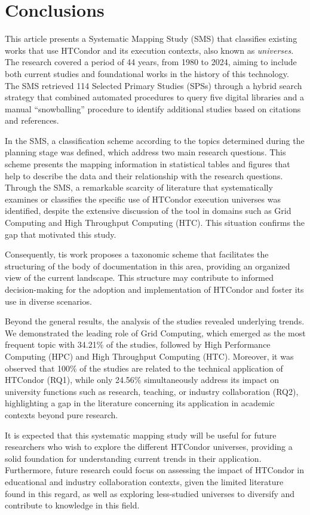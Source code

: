 \section{Conclusions}\label{sec:conclusiones}

This article presents a Systematic Mapping Study (SMS) that classifies existing works that use HTCondor and its execution contexts, also known as \textit{universes}. The research covered a period of 44 years, from 1980 to 2024, aiming to include both current studies and foundational works in the history of this technology. The SMS retrieved 114 Selected Primary Studies (SPSs) through a hybrid search strategy that combined automated procedures to query five digital libraries and a manual “snowballing” procedure to identify additional studies based on citations and references.

In the SMS, a classification scheme according to the topics determined during the planning stage was defined, which address two main research questions. This scheme presents the mapping information in statistical tables and figures that help to describe the data and their relationship with the research questions. Through the SMS, a remarkable scarcity of literature that systematically examines or classifies the specific use of HTCondor execution universes was identified, despite the extensive discussion of the tool in domains such as Grid Computing and High Throughput Computing (HTC). This situation confirms the gap that motivated this study.

Consequently, tis work proposes a taxonomic scheme that facilitates the structuring of the body of documentation in this area, providing an organized view of the current landscape. This structure may contribute to informed decision-making for the adoption and implementation of HTCondor and foster its use in diverse scenarios.

Beyond the general results, the analysis of the studies revealed underlying trends. We demonstrated the leading role of Grid Computing, which emerged as the most frequent topic with 34.21\% of the studies, followed by High Performance Computing (HPC) and High Throughput Computing (HTC). Moreover, it was observed that 100\% of the studies are related to the technical application of HTCondor (RQ1), while only 24.56\% simultaneously address its impact on university functions such as research, teaching, or industry collaboration (RQ2), highlighting a gap in the literature concerning its application in academic contexts beyond pure research.

It is expected that this systematic mapping study will be useful for future researchers who wish to explore the different HTCondor universes, providing a solid foundation for understanding current trends in their application. Furthermore, future research could focus on assessing the impact of HTCondor in educational and industry collaboration contexts, given the limited literature found in this regard, as well as exploring less-studied universes to diversify and contribute to knowledge in this field.